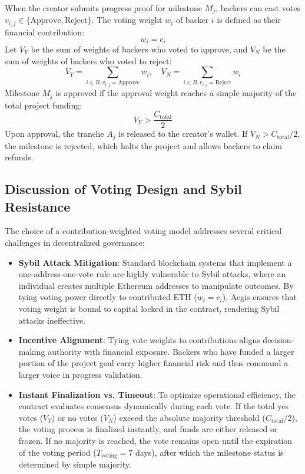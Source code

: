 \documentclass[conference]{IEEEtran}
\begin{document}
When the creator submits progress proof for milestone $M_j$, backers can cast votes $v_{i,j} \in \{\text{Approve}, \text{Reject}\}$. The voting weight $w_i$ of backer $i$ is defined as their financial contribution:
\begin{equation}
w_i = c_i
\end{equation}
Let $V_Y$ be the sum of weights of backers who voted to approve, and $V_N$ be the sum of weights of backers who voted to reject:
\begin{equation}
V_Y = \sum_{i \in B, v_{i,j} = \text{Approve}} w_i, \quad V_N = \sum_{i \in B, v_{i,j} = \text{Reject}} w_i
\end{equation}
Milestone $M_j$ is approved if the approval weight reaches a simple majority of the total project funding:
\begin{equation}
V_Y > \frac{C_{\text{total}}}{2}
\end{equation}
Upon approval, the tranche $A_j$ is released to the creator's wallet. If $V_N > C_{\text{total}}/2$, the milestone is rejected, which halts the project and allows backers to claim refunds.

\subsection{Discussion of Voting Design and Sybil Resistance}
The choice of a contribution-weighted voting model addresses several critical challenges in decentralized governance:
\begin{itemize}
	\item \textbf{Sybil Attack Mitigation}: Standard blockchain systems that implement a one-address-one-vote rule are highly vulnerable to Sybil attacks, where an individual creates multiple Ethereum addresses to manipulate outcomes. By tying voting power directly to contributed ETH ($w_i = c_i$), Aegis ensures that voting weight is bound to capital locked in the contract, rendering Sybil attacks ineffective.
	\item \textbf{Incentive Alignment}: Tying vote weights to contributions aligns decision-making authority with financial exposure. Backers who have funded a larger portion of the project goal carry higher financial risk and thus command a larger voice in progress validation.
	\item \textbf{Instant Finalization vs. Timeout}: To optimize operational efficiency, the contract evaluates consensus dynamically during each vote. If the total yes votes ($V_Y$) or no votes ($V_N$) exceed the absolute majority threshold ($C_{\text{total}}/2$), the voting process is finalized instantly, and funds are either released or frozen. If no majority is reached, the vote remains open until the expiration of the voting period ($T_{\text{voting}} = 7$ days), after which the milestone status is determined by simple majority.
\end{itemize}
\end{document}
